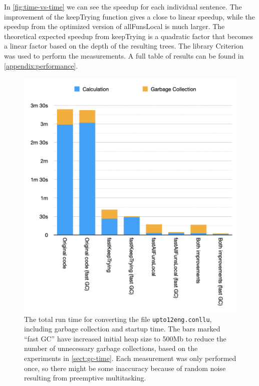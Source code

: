 In \autoref{fig:time-vs-time} we can see the speedup for each individual sentence. The improvement of the keepTrying function gives a close to linear speedup, while the speedup from the optimized version of allFunsLocal is much larger. The theoretical expected speedup from keepTrying is a quadratic factor that becomes a linear factor based on the depth of the resulting trees. The library Criterion\protect\footnotemark{} was used to perform the measurements. A full table of results can be found in \autoref{appendix:performance}.
\begin{figure}
    \centering
    \includegraphics[scale=0.75]{thesis/figure/Time-including-GC.png}
    \caption[The total run time for converting the file \texttt{upto12eng.conllu}, including garbage collection and startup time.]{The total run time for converting the file \texttt{upto12eng.conllu}, including garbage collection and startup time. The bars marked ``fast GC'' have increased initial heap size to 500Mb to reduce the number of unnecessary garbage collections, based on the experiments in \autoref{sect:gc-time}. Each measurement was only performed once, so there might be some inaccuracy because of random noise resulting from preemptive multitasking.}
    \label{fig:time-including-gc}
\end{figure}
